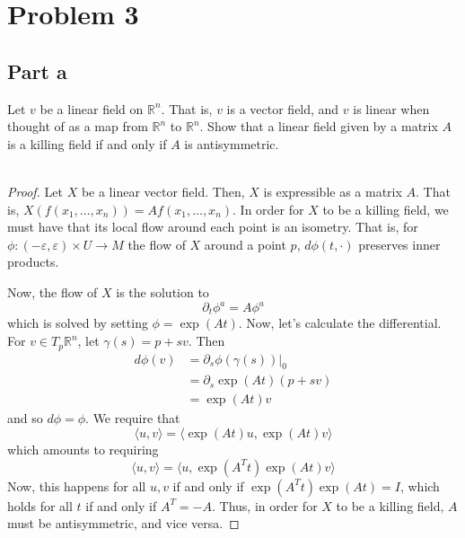 \documentclass[fontsize=11pt]{scrartcl} %
\numberwithin{equation}{section} %
\numberwithin{figure}{section} %
\numberwithin{table}{section} %
\newcommand{\R}{\mathbb{R}}
\begin{document}
\newpage

\section*{Problem 3}
\subsection*{Part a}
Let $v$ be a linear field on $\R^n$. That is, $v$ is a vector field, and $v$ is
linear when thought of as a map from $\R^n$ to $\R^n$. Show that a linear field
given by a matrix $A$ is a killing field if and only if $A$ is antisymmetric.
\\
\\
\begin{proof}
    Let $X$ be a linear vector field. Then, $X$ is expressible as a matrix $A$.
    That is, $X(f(x_1,\dots,x_n)) = Af(x_1,\dots,x_n)$. In order for $X$ to be a
    killing field, we must have that its local flow around each point is an
    isometry. That is, for $\phi:(-\varepsilon,\varepsilon)\times U\to M$ the
    flow of $X$ around a point $p$, $d\phi(t,\cdot)$ preserves inner products.

    Now, the flow of $X$ is the solution to
    \[
        \partial_t\phi^a = A\phi^a
    \]
    which is solved by setting $\phi = \exp(At)$. Now, let's calculate the
    differential. For $v\in T_p\R^n$, let $\gamma(s) = p+sv$. Then
    \[
        \begin{aligned}
            d\phi(v) &= \partial_s\phi(\gamma(s))|_0\\
            &= \partial_s\exp(At)(p+sv)\\
            &=\exp(At)v
        \end{aligned}
    \]
    and so $d\phi = \phi$. We require that
    \[
        \langle u,v\rangle = \langle \exp(At)u,\exp(At)v\rangle
    \]
    which amounts to requiring
    \[
        \langle u,v\rangle = \langle u,\exp(A^Tt)\exp(At)v\rangle
    \]
    Now, this happens for all $u,v$ if and only if $\exp(A^Tt)\exp(At)=I$, which
    holds for all $t$ if and only if $A^T=-A$. Thus, in order for $X$ to be a
    killing field, $A$ must be antisymmetric, and vice versa.
\end{proof}
\end{document}
